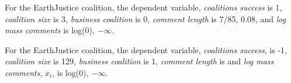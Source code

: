 \documentclass[
      12pt,
        ]{article}
\begin{document}
For the EarthJustice coalition, the dependent variable, \emph{coalitions success} is 1, \emph{coalition size} is 3, \emph{business coalition} is 0, \emph{comment length} is 7/85, 0.08, and \emph{log mass comments} is log(0), \ensuremath{-\infty{}}.

For the EarthJustice coalition, the dependent variable, \emph{coalitions success}, is -1, \emph{coalition size} is 129, \emph{business coalition} is 1, \emph{comment length} is and \emph{log mass comments}, \(x_i\), is log(0), \ensuremath{-\infty{}}.
\newpage
\singlespacing 
                    \renewcommand\refname{Pre-analysis} 
               
  
\end{document}
